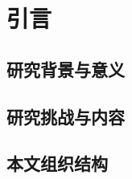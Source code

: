 \chapter{引言}{
{
\let\cleardoublepage\relax
}

\section{研究背景与意义}



\section{研究挑战与内容}



\section{本文组织结构}


}